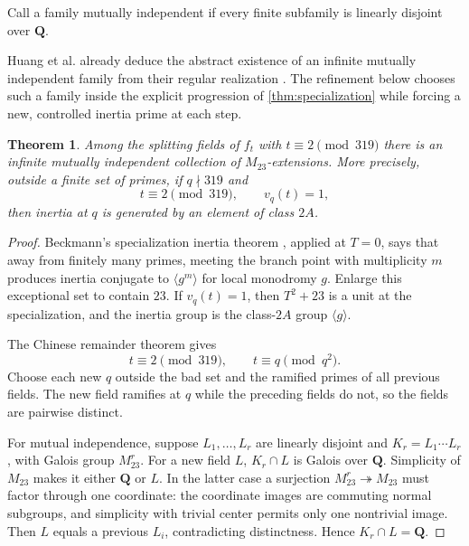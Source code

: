 \documentclass[11pt]{amsart}
\newtheorem{theorem}{Theorem}[section]
\theoremstyle{definition}
\theoremstyle{remark}
\newcommand{\QQ}{\mathbf Q}
\begin{document}
Call a family mutually independent if every finite subfamily is linearly
disjoint over $\QQ$.

Huang et al. already deduce the abstract existence of an infinite mutually
independent family from their regular realization
\cite[Corollary~1.4(d)]{HJLPPZ}.  The refinement below chooses such a family
inside the explicit progression of \cref{thm:specialization} while forcing a
new, controlled inertia prime at each step.

\begin{theorem}\label{thm:distinct}
Among the splitting fields of $f_t$ with $t\equiv2\pmod{319}$ there is an
infinite mutually independent collection of $M_{23}$-extensions.  More
precisely, outside a finite set of primes, if $q\nmid319$ and
\[
 t\equiv2\pmod{319},\qquad v_q(t)=1,
\]
then inertia at $q$ is generated by an element of class $2A$.
\end{theorem}

\begin{proof}
Beckmann's specialization inertia theorem
\cite[Proposition~4.2]{Beckmann}, applied at $T=0$, says that away from
finitely many primes, meeting the branch point with multiplicity $m$
produces inertia conjugate to $\langle g^m\rangle$ for local monodromy $g$.
Enlarge this exceptional set to contain $23$.  If $v_q(t)=1$, then
$T^2+23$ is a unit at the specialization, and the inertia group is the
class-$2A$ group $\langle g\rangle$.

The Chinese remainder theorem gives
\[
 t\equiv2\pmod{319},\qquad t\equiv q\pmod{q^2}.
\]
Choose each new $q$ outside the bad set and the ramified primes of all
previous fields.  The new field ramifies at $q$ while the preceding fields
do not, so the fields are pairwise distinct.

For mutual independence, suppose $L_1,\ldots,L_r$ are linearly disjoint and
$K_r=L_1\cdots L_r$, with Galois group $M_{23}^r$.  For a new field $L$,
$K_r\cap L$ is Galois over $\QQ$.  Simplicity of $M_{23}$ makes it either
$\QQ$ or $L$.  In the latter case a surjection
$M_{23}^r\twoheadrightarrow M_{23}$ must factor through one coordinate:
the coordinate images are commuting normal subgroups, and simplicity with
trivial center permits only one nontrivial image.  Then $L$ equals a previous
$L_i$, contradicting distinctness.  Hence $K_r\cap L=\QQ$.
\end{proof}
\end{document}
